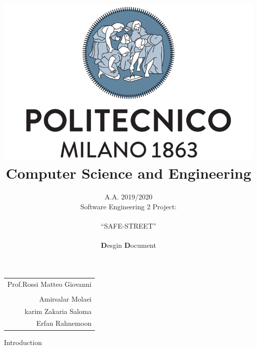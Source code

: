 \documentclass[english]{article}
\newcommand{\forcerighttext}[1]{
\vspace{0.1\textheight}
\par {\raggedleft \begin{tabular}{r}\ignorespaces
#1
\end{tabular}
\hspace{8em}
\vspace{0em}
\par}
}
\begin{document}
\begin{doublespace}

\title{\includegraphics[scale=0.4]{images/polimi}\\Computer Science and Engineering}

\author{A.A. 2019/2020\\
Software Engineering 2 Project: \\
\\
{\LARGE{}``SAFE-STREET''}\textbf{}\\
\\
\textbf{D}esgin \textbf{D}ocument\\
}
\end{doublespace}

\maketitle
\thispagestyle{empty}
\forcerighttext{Prof.Rossi Matteo Giovanni\\
\\Amirsalar Molaei
\\karim Zakaria Saloma
\\Erfan Rahnemoon}


\newpage{}

\tableofcontents{}

\newpage

\listoffigures

\newpage

\listoftables

\clearpage{}

{Introduction}
\end{document}
